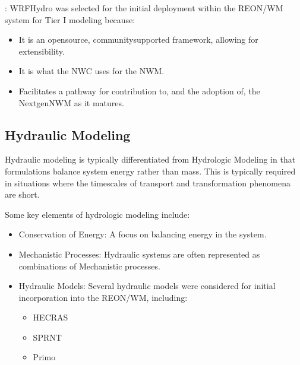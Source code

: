 \documentclass[letterpaper,10pt,english]{sphinxmanual}
\begin{document}
\sphinxAtStartPar
{}: WRF\sphinxhyphen{}Hydro was selected for the initial deployment within the REON/WM system for Tier I modeling because:
\begin{itemize}
\item {} 
\sphinxAtStartPar
It is an open\sphinxhyphen{}source, community\sphinxhyphen{}supported framework, allowing for extensibility.

\item {} 
\sphinxAtStartPar
It is what the NWC uses for the NWM.

\item {} 
\sphinxAtStartPar
Facilitates a pathway for contribution to, and the adoption of, the Nextgen\sphinxhyphen{}NWM as it matures.

\end{itemize}

\subsection{Hydraulic Modeling}
\label{\detokenize{requirements/knowledge/hydraulic:hydraulic-modeling}}\label{\detokenize{requirements/knowledge/hydraulic::doc}}
\sphinxAtStartPar
Hydraulic modeling is typically differentiated from Hydrologic Modeling in that formulations balance system energy rather than mass. This is typically required in situations where the timescales of transport and transformation phenomena are short.

\sphinxAtStartPar
Some key elements of hydrologic modeling include:
\begin{itemize}
\item {} 
\sphinxAtStartPar
Conservation of Energy: A focus on balancing energy in the system.

\item {} 
\sphinxAtStartPar
Mechanistic Processes: Hydraulic systems are often represented as combinations of Mechanistic processes.

\item {} 
\sphinxAtStartPar
Hydraulic Models: Several hydraulic models were considered for initial incorporation into the REON/WM, including:
\begin{itemize}
\item {} 
\sphinxAtStartPar
HEC\sphinxhyphen{}RAS

\item {} 
\sphinxAtStartPar
SPRNT

\item {} 
\sphinxAtStartPar
Primo

\end{itemize}

\end{itemize}
\end{document}
